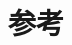 \documentclass[12pt,a4paper,CJK]{beamer}
\begin{document}
\begin{CJK*}{UTF8}{gkai}
\begin{frame}{\subsecname}
\end{frame}

\section{参考}
\begin{frame}{\secname}

\nocite{*}




\end{frame}
\end{CJK*}
\end{document}

